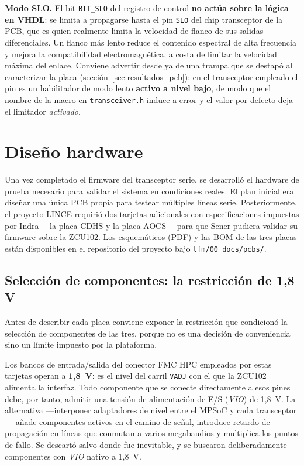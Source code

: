 \textbf{Modo SLO.} El bit \texttt{BIT\_SLO} del registro de control \textbf{no actúa sobre la lógica
en VHDL}: se limita a propagarse hasta el pin \texttt{SLO} del chip transceptor de la PCB, que es
quien realmente limita la velocidad de flanco de sus salidas diferenciales. Un flanco más lento
reduce el contenido espectral de alta frecuencia y mejora la compatibilidad electromagnética, a
costa de limitar la velocidad máxima del enlace. Conviene advertir desde ya de una trampa que se
destapó al caracterizar la placa (sección~\ref{sec:resultados_pcb}): en el transceptor empleado el
pin es un habilitador de modo lento \textbf{activo a nivel bajo}, de modo que el nombre de la macro
en \texttt{transceiver.h} induce a error y el valor por defecto deja el limitador \textit{activado}.

\section{Diseño hardware}

Una vez completado el firmware del transceptor serie, se desarrolló el hardware de prueba
necesario para validar el sistema en condiciones reales. El plan inicial era diseñar una única
PCB propia para testear múltiples líneas serie. Posteriormente, el proyecto LINCE requirió
dos tarjetas adicionales con especificaciones impuestas por Indra ---la placa CDHS y la placa
AOCS--- para que Sener pudiera validar su firmware sobre la ZCU102. Los esquemáticos (PDF)
y las BOM de las tres placas están disponibles en el repositorio del proyecto bajo
\texttt{tfm/00\_docs/pcbs/}.

\subsection{Selección de componentes: la restricción de 1,8 V} \label{sec:seleccion_componentes}

Antes de describir cada placa conviene exponer la restricción que condicionó la selección de
componentes de las tres, porque no es una decisión de conveniencia sino un límite impuesto por la
plataforma.

Los bancos de entrada/salida del conector FMC HPC empleados por estas tarjetas operan a
\textbf{1,8~V}: es el nivel del carril \texttt{VADJ} con el que la ZCU102 alimenta la interfaz. Todo
componente que se conecte directamente a esos pines debe, por tanto, admitir una tensión de
alimentación de E/S (\textit{VIO}) de 1,8~V. La alternativa ---interponer adaptadores de nivel entre
el MPSoC y cada transceptor--- añade componentes activos en el camino de señal, introduce retardo
de propagación en líneas que conmutan a varios megabaudios y multiplica los puntos de fallo. Se
descartó salvo donde fue inevitable, y se buscaron deliberadamente componentes con \textit{VIO}
nativo a 1,8~V.

